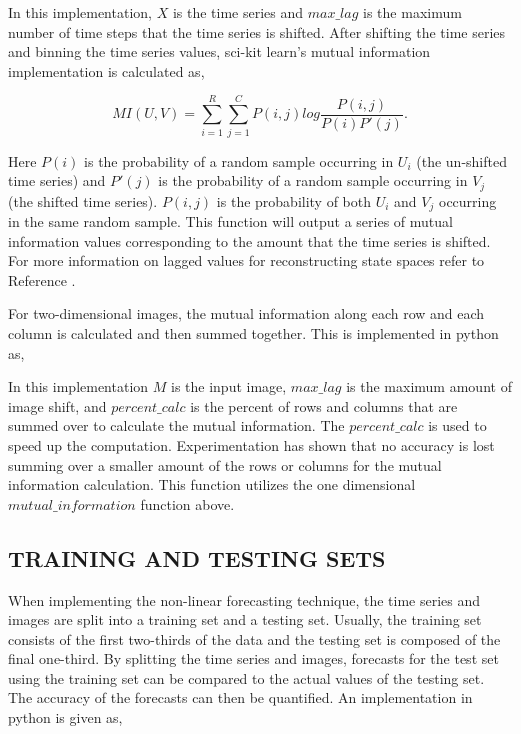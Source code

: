 

In this implementation, $X$ is the time series and $max\_lag$ is the maximum number of time steps that the time series is shifted. After shifting the time series and binning the time series values, sci-kit learn's mutual information implementation is calculated as,

$$MI(U,V) = \sum_{i=1}^R \sum_{j=1}^C P(i,j) log\frac{P(i,j)}{P(i)P'(j)}.$$

Here $P(i)$ is the probability of a random sample occurring in $U_i$ (the un-shifted time series) and $P'(j)$ is the probability of a random sample occurring in $V_j$ (the shifted time series). $P(i,j)$ is the probability of both $U_i$ and $V_j$ occurring in the same random sample. This function will output a series of mutual information values corresponding to the amount that the time series is shifted. For more information on lagged values for reconstructing state spaces refer to Reference \cite{mutual_info}.

For two-dimensional images, the mutual information along each row and each column is calculated and then summed together. This is implemented in python as,



In this implementation $M$ is the input image, $max\_lag$ is the maximum amount of image shift, and $percent\_calc$ is the percent of rows and columns that are summed over to calculate the mutual information. The $percent\_calc$ is used to speed up the computation. Experimentation has shown that no accuracy is lost summing over a smaller amount of the rows or columns for the mutual information calculation. This function utilizes the one dimensional $mutual\_information$ function above.

\subsection{TRAINING AND TESTING SETS}

When implementing the non-linear forecasting technique, the time series and images are split into a training set and a testing set. Usually, the training set consists of the first two-thirds of the data and the testing set is composed of the final one-third. By splitting the time series and images, forecasts for the test set using the training set can be compared to the actual values of the testing set. The accuracy of the forecasts can then be quantified. An implementation in python is given as,

